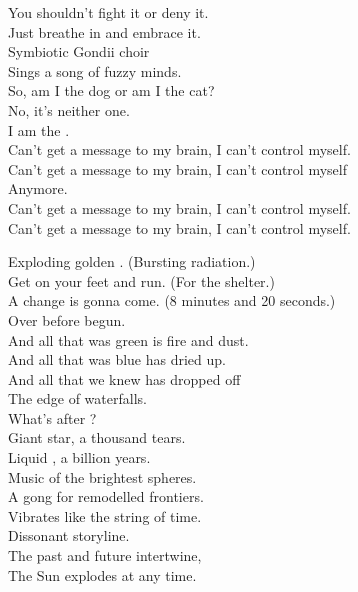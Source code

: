 You shouldn't fight it or deny it. \\
Just breathe in and embrace it. \\
Symbiotic Gondii choir \\
Sings a song of fuzzy minds. \\
So, am I the dog or am I the cat? \\
No, it's neither one. \\
I am the . \\

Can't get a message to my brain, I can't control myself. \\
Can't get a message to my brain, I can't control myself \\
Anymore. \\

Can't get a message to my brain, I can't control myself. \\
Can't get a message to my brain, I can't control myself. \\





Exploding golden . (Bursting radiation.) \\
Get on your feet and run. (For the shelter.) \\
A change is gonna come. (8 minutes and 20 seconds.) \\
Over before begun. \\

And all that was green is fire and dust. \\
And all that was blue has dried up. \\
And all that we knew has dropped off \\
The edge of waterfalls. \\
What's after ? \\

Giant star, a thousand tears. \\
Liquid , a billion years. \\
Music of the brightest spheres. \\
A gong for remodelled frontiers. \\

Vibrates like the string of time. \\
Dissonant storyline. \\
The past and future intertwine, \\
The Sun explodes at any time. \\

